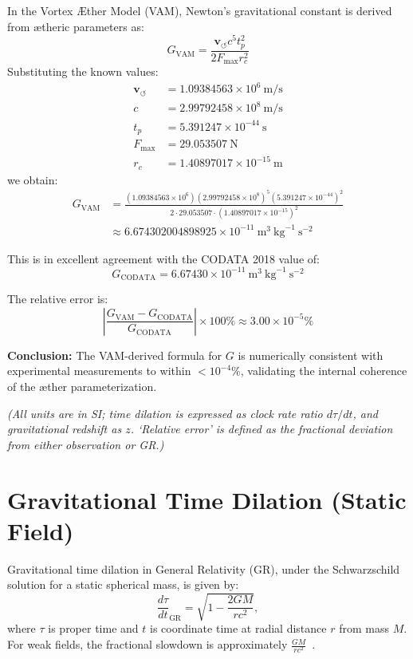 \documentclass[a4paper, aps,preprint,superscriptaddress, 12pt]{revtex4}
\begin{document}
In the Vortex Æther Model (VAM), Newton's gravitational constant is derived from ætheric parameters as:
\begin{equation}
G_\text{VAM} = \frac{\mathbf{v}_{\scriptscriptstyle\boldsymbol{\circlearrowleft}} c^5 t_p^2}{2 F_{\max} r_c^2}
\end{equation}
Substituting the known values:
\begin{align*}
\mathbf{v}_{\scriptscriptstyle\boldsymbol{\circlearrowleft}} &= 1.09384563 \times 10^6 \ \text{m/s} \\
c &= 2.99792458 \times 10^8 \ \text{m/s} \\
t_p &= 5.391247 \times 10^{-44} \ \text{s} \\
F_{\max} &= 29.053507 \ \text{N} \\
r_c &= 1.40897017 \times 10^{-15} \ \text{m}
\end{align*}
we obtain:
\begin{align*}
G_\text{VAM} &= \frac{(1.09384563 \times 10^6)(2.99792458 \times 10^8)^5 (5.391247 \times 10^{-44})^2}{2 \cdot 29.053507 \cdot (1.40897017 \times 10^{-15})^2} \\
&\approx 6.674302004898925 \times 10^{-11} \ \text{m}^3 \ \text{kg}^{-1} \ \text{s}^{-2}
\end{align*}

This is in excellent agreement with the CODATA 2018 value of:
\[
G_\text{CODATA} = 6.67430 \times 10^{-11} \ \text{m}^3 \ \text{kg}^{-1} \ \text{s}^{-2}
\]

The relative error is:
\[
\left| \frac{G_\text{VAM} - G_\text{CODATA}}{G_\text{CODATA}} \right| \times 100\% \approx 3.00 \times 10^{-5}\%
\]

\noindent
\textbf{Conclusion:} The VAM-derived formula for \( G \) is numerically consistent with experimental measurements to within \( < 10^{-4}\% \), validating the internal coherence of the æther parameterization.

\textit{(All units are in SI; time dilation is expressed as clock rate ratio $d\tau/dt$, and gravitational redshift as $z$. ‘Relative error' is defined as the fractional deviation from either observation or GR.)}
\section{Gravitational Time Dilation (Static Field)}

Gravitational time dilation in General Relativity (GR), under the Schwarzschild solution for a static spherical mass, is given by:
\[
    \frac{d\tau}{dt}_\text{GR} = \sqrt{1 - \frac{2GM}{rc^2}},
\]
where $\tau$ is proper time and $t$ is coordinate time at radial distance $r$ from mass $M$. For weak fields, the fractional slowdown is approximately $\frac{GM}{rc^2}$~\cite{will2014confrontation}.
\end{document}
